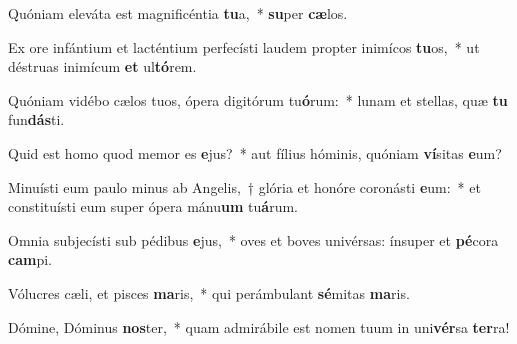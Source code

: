 \item Quóniam eleváta est magnificéntia \textbf{tu}a,~* \textbf{su}per \textbf{cæ}los.
\item Ex ore infántium et lacténtium perfecísti laudem propter inimícos \textbf{tu}os,~* ut déstruas inimícum \textbf{et} ul\textbf{tó}rem.
\item Quóniam vidébo cælos tuos, ópera digitórum tu\textbf{ó}rum:~* lunam et stellas, quæ \textbf{tu} fun\textbf{dás}ti.
\item Quid est homo quod memor es \textbf{e}jus?~* aut fílius hóminis, quóniam \textbf{ví}sitas \textbf{e}um?
\item Minuísti eum paulo minus ab Angelis,~† glória et honóre coronásti \textbf{e}um:~* et constituísti eum super ópera mánu\textbf{um} tu\textbf{á}rum.
\item Omnia subjecísti sub pédibus \textbf{e}jus,~* oves et boves univérsas: ínsuper et \textbf{pé}cora \textbf{cam}pi.
\item Vólucres cæli, et pisces \textbf{ma}ris,~* qui perámbulant \textbf{sé}mitas \textbf{ma}ris.
\item Dómine, Dóminus \textbf{nos}ter,~* quam admirábile est nomen tuum in uni\textbf{vér}sa \textbf{ter}ra!
